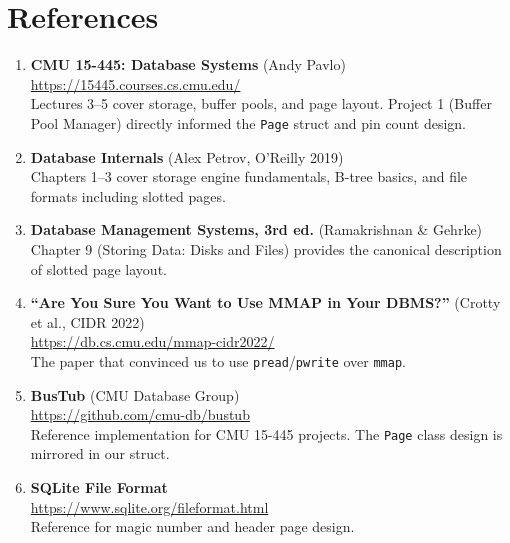 \documentclass[12pt, a4paper]{report}
\begin{document}
\section{References}

\begin{enumerate}[itemsep=6pt]
    \item \textbf{CMU 15-445: Database Systems} (Andy Pavlo)\\
          \url{https://15445.courses.cs.cmu.edu/}\\
          Lectures 3--5 cover storage, buffer pools, and page layout.
          Project 1 (Buffer Pool Manager) directly informed the
          \texttt{Page} struct and pin count design.

    \item \textbf{Database Internals} (Alex Petrov, O'Reilly 2019)\\
          Chapters 1--3 cover storage engine fundamentals, B-tree
          basics, and file formats including slotted pages.

    \item \textbf{Database Management Systems, 3rd ed.} (Ramakrishnan \& Gehrke)\\
          Chapter 9 (Storing Data: Disks and Files) provides the
          canonical description of slotted page layout.

    \item \textbf{``Are You Sure You Want to Use MMAP in Your DBMS?''}
          (Crotty et al., CIDR 2022)\\
          \url{https://db.cs.cmu.edu/mmap-cidr2022/}\\
          The paper that convinced us to use \texttt{pread}/\texttt{pwrite}
          over \texttt{mmap}.

    \item \textbf{BusTub} (CMU Database Group)\\
          \url{https://github.com/cmu-db/bustub}\\
          Reference implementation for CMU 15-445 projects. The
          \texttt{Page} class design is mirrored in our struct.

    \item \textbf{SQLite File Format}\\
          \url{https://www.sqlite.org/fileformat.html}\\
          Reference for magic number and header page design.
\end{enumerate}
\end{document}
